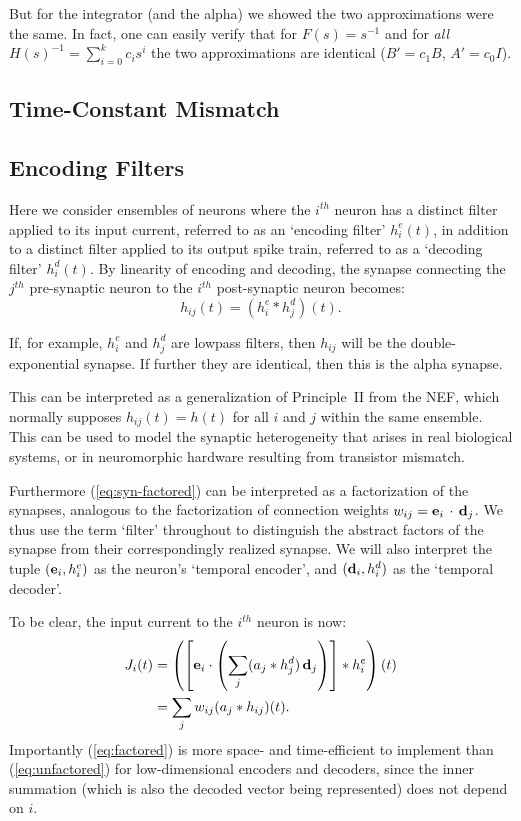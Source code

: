 But for the integrator (and the alpha) we showed the two approximations were the same.
In fact, one can easily verify that for $F(s) = s^{-1}$ and for {\it all} $H(s)^{-1} = \sum_{i=0}^k c_i s^i$ the two approximations are identical ($B' = c_1 B$, $A' = c_0 I$).

\subsection{Time-Constant Mismatch}

\subsection{Encoding Filters}

Here we consider ensembles of neurons where the $i^{th}$ neuron has a distinct filter applied to its input current, referred to as an `encoding filter' $h^e_i(t)$, in addition to a distinct filter applied to its output spike train, referred to as a `decoding filter' $h^d_i(t)$. 
By linearity of encoding and decoding, the synapse connecting the $j^{th}$ pre-synaptic neuron to the $i^{th}$ post-synaptic neuron becomes:
\begin{equation} \label{eq:syn-factored}
h_{ij}(t) = (h^e_i \ast h^d_j)(t) .
\end{equation}

If, for example, $h^e_i$ and $h^d_j$ are lowpass filters, then $h_{ij}$ will be the double-exponential synapse. If further  they are identical, then this is the alpha synapse.

This can be interpreted as a generalization of Principle~II from the NEF, which normally supposes $h_{ij}(t) = h(t)$ for all $i$ and $j$ within the same ensemble.
This can be used to model the synaptic heterogeneity that arises in real biological systems, or in neuromorphic hardware resulting from transistor mismatch. 

Furthermore (\ref{eq:syn-factored}) can be interpreted as a factorization of the synapses, analogous to the factorization of connection weights \mbox{$w_{ij} = \mathbf{e}_i \, \cdot \, \mathbf{d}_j$}.
We thus use the term `filter' throughout to distinguish the abstract factors of the synapse from their correspondingly realized synapse.
We will also interpret the tuple $(\mathbf{e}_i, h^e_i)$ as the neuron's `temporal encoder', and $(\mathbf{d}_i, h^d_i)$ as the `temporal decoder'.

To be clear, the input current to the $i^{th}$ neuron is now:
\begin{align}
J_i(t) &= \left( \left[ \mathbf{e}_i \cdot \left( \sum_j ( a_j \ast h^d_j) \, \mathbf{d}_j \right) \right] \ast h^e_i \right)(t) \label{eq:factored} \\
       &= \sum_j w_{ij} (a_j \ast h_{ij})(t) . \label{eq:unfactored}
\end{align}
Importantly (\ref{eq:factored}) is more space- and time-efficient to implement than (\ref{eq:unfactored}) for low-dimensional encoders and decoders, since the inner summation (which is also the decoded vector being represented) does not depend on $i$.

